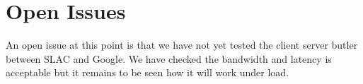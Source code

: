 \section{Open Issues} \label{sec:open}

An open issue at this point is that we have not yet tested the client server butler between SLAC and Google.
We have checked the bandwidth and latency is acceptable but it remains to be seen how it will work under load.
~
~
